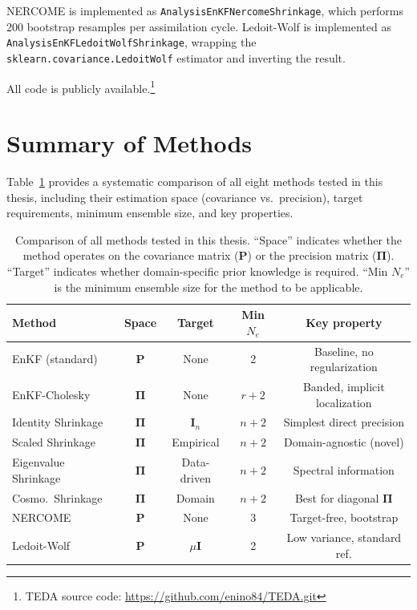 NERCOME is implemented as \texttt{AnalysisEnKFNercomeShrinkage}, which performs 200 bootstrap resamples per assimilation cycle. Ledoit-Wolf is implemented as \texttt{AnalysisEnKFLedoitWolfShrinkage}, wrapping the \texttt{sklearn.covariance.LedoitWolf} estimator and inverting the result.

All code is publicly available.\footnote{TEDA source code: \url{https://github.com/enino84/TEDA.git}}

\section{Summary of Methods}
\label{sec:method_summary}

Table~\ref{tab:method_summary} provides a systematic comparison of all eight methods tested in this thesis, including their estimation space (covariance vs.\ precision), target requirements, minimum ensemble size, and key properties.

\begin{table}[t]
\centering
\caption{Comparison of all methods tested in this thesis. ``Space'' indicates whether the method operates on the covariance matrix ($\mathbf{P}$) or the precision matrix ($\boldsymbol{\Pi}$). ``Target'' indicates whether domain-specific prior knowledge is required. ``Min $N_e$'' is the minimum ensemble size for the method to be applicable.}
\label{tab:method_summary}
\begin{tabular}{@{}lcccc@{}}
\toprule
Method & Space & Target & Min $N_e$ & Key property \\
\midrule
EnKF (standard) & $\mathbf{P}$ & None & 2 & Baseline, no regularization \\
EnKF-Cholesky & $\boldsymbol{\Pi}$ & None & $r + 2$ & Banded, implicit localization \\
Identity Shrinkage & $\boldsymbol{\Pi}$ & $\mathbf{I}_n$ & $n + 2$ & Simplest direct precision \\
Scaled Shrinkage & $\boldsymbol{\Pi}$ & Empirical & $n + 2$ & Domain-agnostic (novel) \\
Eigenvalue Shrinkage & $\boldsymbol{\Pi}$ & Data-driven & $n + 2$ & Spectral information \\
Cosmo.\ Shrinkage & $\boldsymbol{\Pi}$ & Domain & $n + 2$ & Best for diagonal $\boldsymbol{\Pi}$ \\
NERCOME & $\mathbf{P}$ & None & 3 & Target-free, bootstrap \\
Ledoit-Wolf & $\mathbf{P}$ & $\mu\mathbf{I}$ & 2 & Low variance, standard ref. \\
\bottomrule
\end{tabular}
\end{table}

